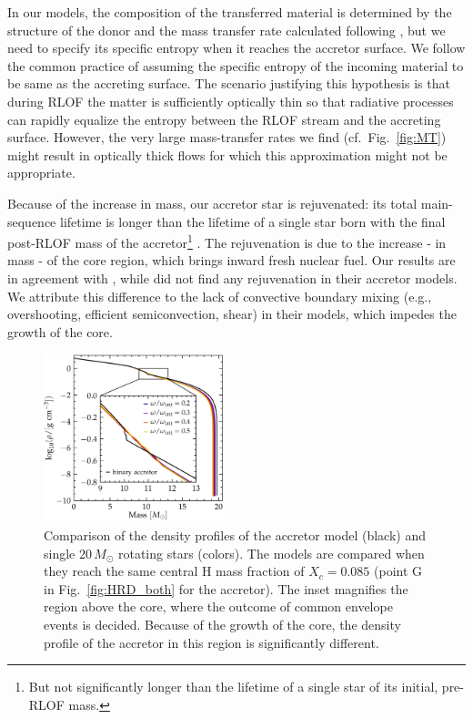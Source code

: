 \documentclass[twocolumn,twocolappendix,trackchanges]{aastex63}
\DeclareRobustCommand{\Figref}[1]{Fig.~\ref{#1}}
\begin{document}
In our models, the composition of the transferred material is
determined by the structure of the donor and the mass transfer rate
calculated following \cite{kolb:90}, but we need to specify its
specific entropy when it reaches the accretor surface. We follow the
common practice of assuming the specific entropy of the incoming
material to be same as the accreting surface. The scenario justifying
this hypothesis is that during RLOF the matter is
sufficiently optically thin so that radiative processes can rapidly
equalize the entropy between the RLOF stream and the accreting
surface. However, the very large mass-transfer rates we find
(cf.~\Figref{fig:MT}) might result in optically thick flows for which
this approximation might not be appropriate.

Because of the increase in mass, our accretor star is rejuvenated: its
total main-sequence lifetime is longer than the lifetime of a single
star born with the final post-RLOF mass of the accretor\footnote{But
  not significantly longer than the lifetime of a single star of its initial,
  pre-RLOF mass.}
\citep[e.g.,][]{schneider:16}. The rejuvenation is due to the increase
- in mass - of the core region, which brings inward fresh
nuclear fuel. Our results are in agreement with \cite{hellings:83},
while \cite{braun:95} did not find any rejuvenation in their accretor
models. We attribute this difference to the lack of convective
boundary mixing (e.g., overshooting, efficient semiconvection, shear)
in their models, which impedes the growth of the core.

\begin{figure}[htbp]
  \includegraphics[width=0.47\textwidth]{rho_comparison}
  \caption{Comparison of the density profiles of the accretor model
    (black) and single $20\,M_\odot$ rotating stars (colors). The models are
    compared when they reach the same central H mass fraction of
    $X_c=0.085$ (point G in \Figref{fig:HRD_both} for the accretor). The inset magnifies the region above the core, where the outcome of common envelope events is
    decided. Because of the growth of the core, the density profile of
  the accretor in this region is significantly different.}
  \label{fig:rho}
\end{figure}
\end{document}
